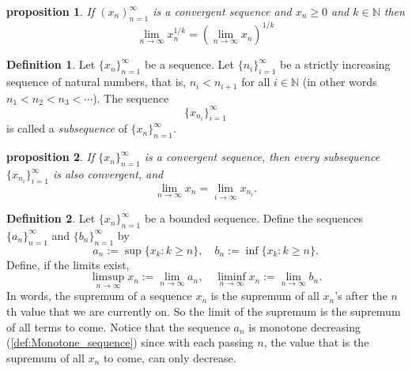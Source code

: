\documentclass{article}
\newtheorem{proposition}{Proposition}[section]
\newtheorem{proposition}{proposition}[section]
\theoremstyle{definition}
\newtheorem{definition}{Definition}[section]
\theoremstyle{remark}
\begin{document}
\begin{proposition}
If $ (x_n)^\infty_{n=1}$ is a convergent sequence and $ x_n \geq 0 $ and $ k \in \mathbb{N}$ then
\[
\lim_{n \to \infty}{x_n^{1/k}} = \left( \lim_{n \to \infty}{x_n}\right)^{1/k}
\]
\end{proposition}







\begin{definition} \label{def:subsequence}
Let \( \{x_n\}_{n=1}^{\infty} \) be a sequence. Let \( \{n_i\}_{i=1}^{\infty} \) be a strictly increasing sequence of natural numbers, that is, \( n_i < n_{i+1} \) for all \( i \in \mathbb{N} \) (in other words \( n_1 < n_2 < n_3 < \cdots \)). The sequence
\[
\{x_{n_i}\}_{i=1}^{\infty}
\]
is called a \textit{subsequence} of \( \{x_n\}_{n=1}^{\infty} \).
\end{definition}




\begin{proposition} \label{prp:subsequence limit equal to limit}
If \( \{x_n\}_{n=1}^{\infty} \) is a convergent sequence, then every subsequence \( \{x_{n_i}\}_{i=1}^{\infty} \) is also convergent, and
\[
\lim_{n \to \infty} x_n = \lim_{i \to \infty} x_{n_i}.
\]
\end{proposition}







\begin{definition} \label{def:limsup_liminf}
Let \( \{x_n\}_{n=1}^{\infty} \) be a bounded sequence. Define the sequences \( \{a_n\}_{n=1}^{\infty} \) and \( \{b_n\}_{n=1}^{\infty} \) by
\[
a_n := \sup\{ x_k : k \geq n \}, \quad b_n := \inf\{ x_k : k \geq n \}.
\]
Define, if the limits exist,
\[
\limsup_{n \to \infty} x_n := \lim_{n \to \infty} a_n, \quad \liminf_{n \to \infty} x_n := \lim_{n \to \infty} b_n.
\]
In words, the supremum of a sequence $x_n$ is the supremum of all $x_n$'s after the $n$th value that we are currently on. So the limit of the supremum is the supremum of all terms to 
come. Notice that the sequence $a_n$ is monotone decreasing (\ref{def:Monotone_sequence}) since 
with each passing $n$, the value that is the supremum of all $x_n$ to come,
can only decrease. 


\end{definition}
\end{document}
